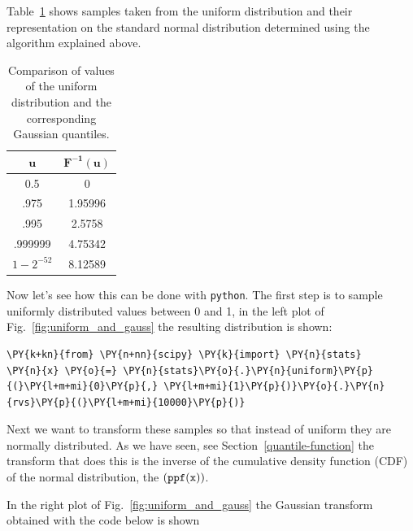 Table~\ref{tab:transformation} shows samples taken from the
uniform distribution and their representation on the standard normal
distribution determined using the algorithm explained above.

\begin{table}[h]
  \centering
  \begin{tabular}{|c|c|}
    \hline
    \(\mathbf{u}\) & \(\mathbf{F^{-1}(u)}\) \\
    \hline
    0.5 & 0 \\
    \hline
    .975 & 1.95996 \\
    \hline
    .995 & 2.5758 \\
    \hline
    .999999 & 4.75342 \\
    \hline
    \(1-2^{-52}\) & 8.12589 \\
    \hline
  \end{tabular}
  \caption{Comparison of values of the uniform distribution and the corresponding Gaussian quantiles.}
\label{tab:transformation}
\end{table}

Now let's see how this can be done with \texttt{python}. The first step is to sample
uniformly distributed values between 0 and 1, in the left plot of Fig.~\ref{fig:uniform_and_gauss} the resulting distribution is shown:

\begin{tcolorbox}[breakable, size=fbox, boxrule=1pt, pad at break*=1mm,colback=cellbackground, colframe=cellborder]
\begin{Verbatim}[commandchars=\\\{\}]
\PY{k+kn}{from} \PY{n+nn}{scipy} \PY{k}{import} \PY{n}{stats}
\PY{n}{x} \PY{o}{=} \PY{n}{stats}\PY{o}{.}\PY{n}{uniform}\PY{p}{(}\PY{l+m+mi}{0}\PY{p}{,} \PY{l+m+mi}{1}\PY{p}{)}\PY{o}{.}\PY{n}{rvs}\PY{p}{(}\PY{l+m+mi}{10000}\PY{p}{)}
\end{Verbatim}
\end{tcolorbox}

    Next we want to transform these samples so that instead of uniform they
are normally distributed. As we have seen, see Section~\ref{quantile-function} the transform that does this
is the inverse of the cumulative density function (CDF) of the normal
distribution, the \((\tt{ppf(x))}\). 

In the right plot of Fig.~\ref{fig:uniform_and_gauss} the Gaussian transform obtained 
with the code below is shown

